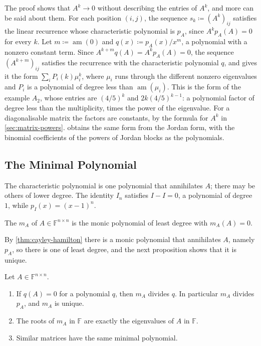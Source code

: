 The proof shows that $A^k\to0$ without describing the entries of $A^k$, and more can be said about them. For each position $(i,j)$, the sequence $s_k\coloneqq(A^k)_{ij}$ satisfies the linear recurrence whose characteristic polynomial is $p_A$, since $A^kp_A(A)=0$ for every $k$. Let $m\coloneqq\operatorname{am}(0)$ and $q(x)\coloneqq p_A(x)/x^m$, a polynomial with a nonzero constant term. Since $A^{k+m}q(A)=A^kp_A(A)=0$, the sequence $(A^{k+m})_{ij}$ satisfies the recurrence with the characteristic polynomial $q$, and  gives it the form $\sum_iP_i(k)\mu_i^k$, where $\mu_i$ runs through the different nonzero eigenvalues and $P_i$ is a polynomial of degree less than $\operatorname{am}(\mu_i)$. This is the form of the example $A_2$, whose entries are $(4/5)^k$ and $2k(4/5)^{k-1}$: a polynomial factor of degree less than the multiplicity, times the power of the eigenvalue. For a diagonalisable matrix the factors are constants, by the formula for $A^k$ in \cref{sec:matrix-powers}.  obtains the same form from the Jordan form, with the binomial coefficients of the powers of Jordan blocks as the polynomials.

\subsection{The Minimal Polynomial}

The characteristic polynomial is one polynomial that annihilates $A$; there may be others of lower degree. The identity $I_n$ satisfies $I-I=0$, a polynomial of degree $1$, while $p_I(x)=(x-1)^n$.

\begin{definition}
\label{def:minimal-polynomial}
The  $m_A$ of $A\in\mathbb F^{n\times n}$ is the monic polynomial of least degree with $m_A(A)=0$.
\end{definition}

By \cref{thm:cayley-hamilton} there is a monic polynomial that annihilates $A$, namely $p_A$, so there is one of least degree, and the next proposition shows that it is unique.

\begin{proposition}
\label{prop:minimal-polynomial}
Let $A\in\mathbb F^{n\times n}$.
\begin{enumerate}
\item If $q(A)=0$ for a polynomial $q$, then $m_A$ divides $q$. In particular $m_A$ divides $p_A$, and $m_A$ is unique.
\item The roots of $m_A$ in $\mathbb F$ are exactly the eigenvalues of $A$ in $\mathbb F$.
\item Similar matrices have the same minimal polynomial.
\end{enumerate}
\end{proposition}

